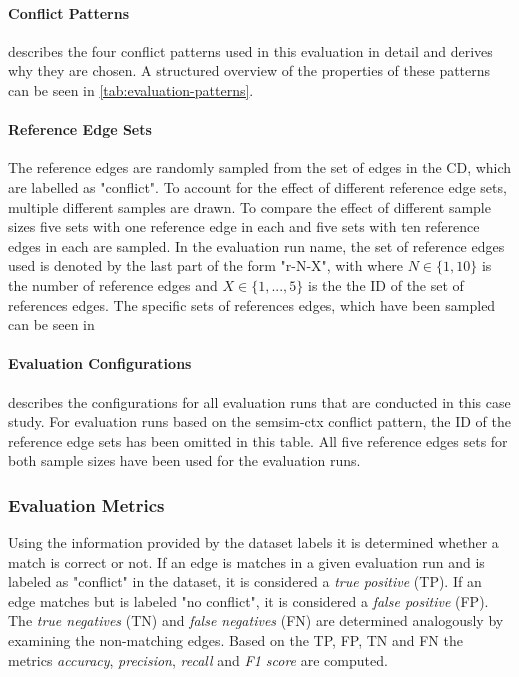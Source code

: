 \documentclass[11pt]{scrreprt}
\begin{document}

\paragraph{Conflict Patterns}
 describes the four conflict patterns used in this evaluation in detail and derives why they are chosen. A structured overview of the properties of these patterns can be seen in \cref{tab:evaluation-patterns}.

\paragraph{Reference Edge Sets}
The reference edges are randomly sampled from the set of edges in the CD, which are labelled as "conflict". To account for the effect of different reference edge sets, multiple different samples are drawn. To compare the effect of different sample sizes five sets with one reference edge in each and five sets with ten reference edges in each are sampled. In the evaluation run name, the set of reference edges used is denoted by the last part of the form "r-N-X", with where \(N \in \{1, 10\}\) is the number of reference edges and \(X \in \{1, ..., 5\}\) is the the ID of the set of references edges. The specific sets of references edges, which have been sampled can be seen in 

\paragraph{Evaluation Configurations}
 describes the configurations for all evaluation runs that are conducted in this case study. For evaluation runs based on the semsim-ctx conflict pattern, the ID of the reference edge sets has been omitted in this table. All five reference edges sets for both sample sizes have been used for the evaluation runs.

\subsubsection{Evaluation Metrics}
Using the information provided by the dataset labels it is determined whether a match is correct or not. If an edge is matches in a given evaluation run and is labeled as "conflict" in the dataset, it is considered a \textit{true positive} (TP). If an edge matches but is labeled "no conflict", it is considered a \textit{false positive} (FP). The \textit{true negatives} (TN) and \textit{false negatives} (FN) are determined analogously  by examining the non-matching edges. Based on the TP, FP, TN and FN the metrics \textit{accuracy}, \textit{precision}, \textit{recall} and \textit{F1 score} are computed.
\end{document}
